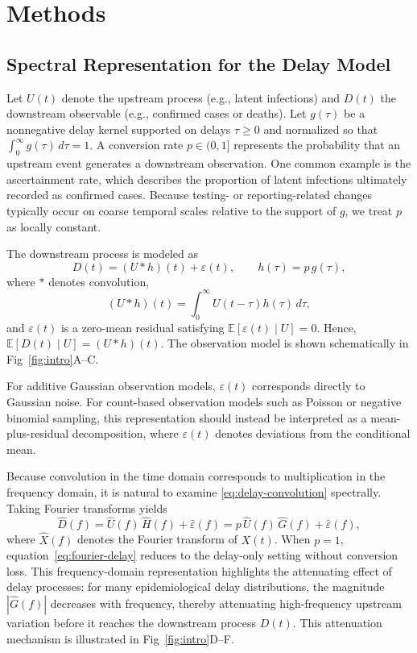 \section*{Methods}

\subsection*{Spectral Representation for the Delay Model}
Let \(U(t)\) denote the upstream process (e.g., latent infections) and \(D(t)\) the downstream observable (e.g., confirmed cases or deaths). Let \(g(\tau)\) be a nonnegative delay kernel supported on delays \(\tau \ge 0\) and normalized so that \(\int_0^\infty g(\tau)\, d\tau = 1\). A conversion rate $p\in(0,1]$ represents the probability that an upstream event generates a downstream observation. One common example is the ascertainment rate, which describes the proportion of latent infections ultimately recorded as confirmed cases. Because testing- or reporting-related changes typically occur on coarse temporal scales\cite{colman2023ascertainment, eales2023dynamics, ward2024real} relative to the support of $g$, we treat $p$ as locally constant.

The downstream process is modeled as
\begin{equation}
D(t)
= (U*h)(t) + \varepsilon(t),
\qquad
h(\tau)=p\,g(\tau),
\label{eq:delay-convolution}
\end{equation}
where \(*\) denotes convolution,
\[
(U*h)(t)=\int_{0}^{\infty}U(t-\tau)h(\tau)\,d\tau,
\]
and \(\varepsilon(t)\) is a zero-mean residual satisfying
\(\mathbb{E}[\varepsilon(t)\mid U]=0\). Hence,
\(\mathbb{E}[D(t)\mid U]=(U*h)(t).\) The observation model is shown schematically in Fig~\ref{fig:intro}A--C. 

For additive Gaussian observation models, \(\varepsilon(t)\) corresponds directly to Gaussian noise. For count-based observation models such as Poisson or negative binomial sampling, this representation should instead be interpreted as a mean-plus-residual decomposition, where \(\varepsilon(t)\) denotes deviations from the conditional mean.

Because convolution in the time domain corresponds to multiplication in the frequency domain, it is natural to examine \eqref{eq:delay-convolution} spectrally. Taking Fourier transforms yields
\begin{equation}
\widehat{D}(f)
= \widehat{U}(f)\,\widehat{H}(f) + \widehat{\varepsilon}(f)
= p\,\widehat{U}(f)\,\widehat{G}(f) + \widehat{\varepsilon}(f),
\label{eq:fourier-delay}
\end{equation}
where \(\widehat{X}(f)\) denotes the Fourier transform of \(X(t)\). When \(p=1\), equation~\eqref{eq:fourier-delay} reduces to the delay-only setting without conversion loss. This frequency-domain representation highlights the attenuating effect of delay processes: for many epidemiological delay distributions, the magnitude \(|\widehat{G}(f)|\) decreases with frequency, thereby attenuating high-frequency upstream variation before it reaches the downstream process \(D(t)\). This attenuation mechanism is illustrated in Fig~\ref{fig:intro}D--F.

